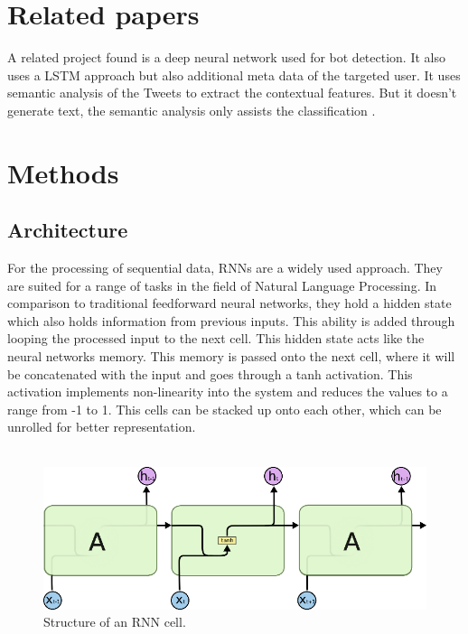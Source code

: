 \documentclass[hidelinks, conference]{IEEEtran}
\begin{document}
\section{Related papers}

A related project found is a deep neural network used for bot detection. It also uses a LSTM approach but also additional meta data of the targeted user. It uses semantic analysis of the Tweets to extract the contextual features. But it doesn’t generate text, the semantic analysis only assists the classification \cite{tim2}.

\section{Methods}

\subsection{Architecture}

For the processing of sequential data, RNNs are a widely used approach. They are suited for a range of tasks in the field of Natural Language Processing. In comparison to traditional feedforward neural networks, they hold a hidden state which also holds information from previous inputs. This ability is added through looping the processed input to the next cell. This hidden state acts like the neural networks memory. This memory is passed onto the next cell, where it will be concatenated with the input and goes through a tanh activation. This activation implements non-linearity into the system and reduces the values to a range from -1 to 1. This cells can be stacked up onto each other, which can be unrolled for better representation.\\
\\

\begin{figure}[htbp]
\centerline{\includegraphics{pictures/structure_rnn.png}}
\caption{Structure of an RNN cell.}
\label{fig:structure_rnn}
\end{figure}
\end{document}
